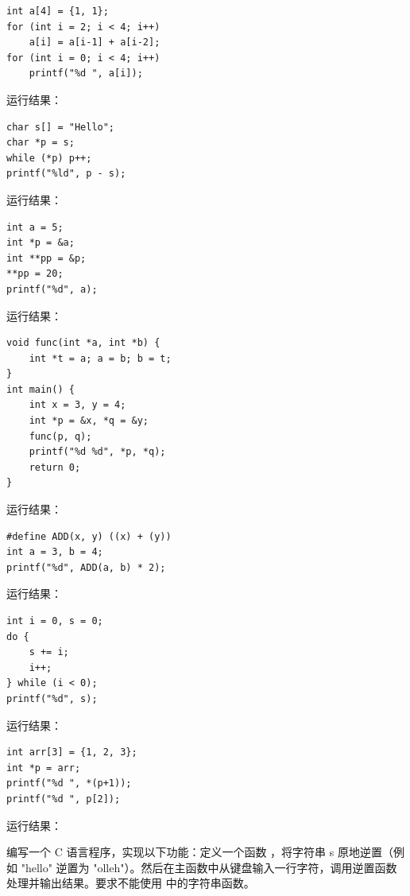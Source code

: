 \documentclass[a4paper,11pt]{article}
\begin{document}
\q
\begin{lstlisting}[language={[custom]C}]
int a[4] = {1, 1};
for (int i = 2; i < 4; i++)
    a[i] = a[i-1] + a[i-2];
for (int i = 0; i < 4; i++)
    printf("%d ", a[i]);
\end{lstlisting}
运行结果：\underline{\hspace{3cm}}


\q
\begin{lstlisting}[language={[custom]C}]
char s[] = "Hello";
char *p = s;
while (*p) p++;
printf("%ld", p - s);
\end{lstlisting}
运行结果：\underline{\hspace{3cm}}


\q
\begin{lstlisting}[language={[custom]C}]
int a = 5;
int *p = &a;
int **pp = &p;
**pp = 20;
printf("%d", a);
\end{lstlisting}
运行结果：\underline{\hspace{3cm}}


\q
\begin{lstlisting}[language={[custom]C}]
void func(int *a, int *b) {
    int *t = a; a = b; b = t;
}
int main() {
    int x = 3, y = 4;
    int *p = &x, *q = &y;
    func(p, q);
    printf("%d %d", *p, *q);
    return 0;
}
\end{lstlisting}
运行结果：\underline{\hspace{3cm}}


\q
\begin{lstlisting}[language={[custom]C}]
#define ADD(x, y) ((x) + (y))
int a = 3, b = 4;
printf("%d", ADD(a, b) * 2);
\end{lstlisting}
运行结果：\underline{\hspace{3cm}}


\q
\begin{lstlisting}[language={[custom]C}]
int i = 0, s = 0;
do {
    s += i;
    i++;
} while (i < 0);
printf("%d", s);
\end{lstlisting}
运行结果：\underline{\hspace{3cm}}


\q
\begin{lstlisting}[language={[custom]C}]
int arr[3] = {1, 2, 3};
int *p = arr;
printf("%d ", *(p+1));
printf("%d ", p[2]);
\end{lstlisting}
运行结果：\underline{\hspace{3cm}}



\pq 编写一个 C 语言程序，实现以下功能：定义一个函数 ，将字符串 s 原地逆置（例如 "hello" 逆置为 "olleh"）。然后在主函数中从键盘输入一行字符，调用逆置函数处理并输出结果。要求不能使用  中的字符串函数。
\anslines{5cm}
\end{document}
